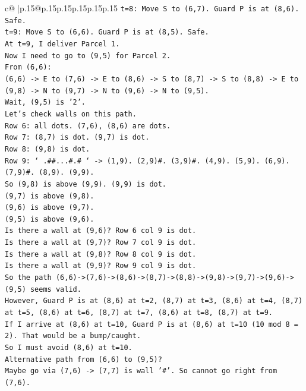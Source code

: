 \documentclass{article}
\begin{document}
{\begin{supertabular}{c@{$\;$}|p{.15\linewidth}@{}p{.15\linewidth}p{.15\linewidth}p{.15\linewidth}p{.15\linewidth}p{.15\linewidth}}
{{{\texttt{t=8: Move S to (6,7). Guard P is at (8,6). Safe.} \\
\texttt{t=9: Move S to (6,6). Guard P is at (8,5). Safe.} \\
\texttt{At t=9, I deliver Parcel 1.} \\
\texttt{Now I need to go to (9,5) for Parcel 2.} \\
\texttt{From (6,6):} \\
\texttt{(6,6) {-}> E to (7,6) {-}> E to (8,6) {-}> S to (8,7) {-}> S to (8,8) {-}> E to (9,8) {-}> N to (9,7) {-}> N to (9,6) {-}> N to (9,5).} \\
\texttt{Wait, (9,5) is '2'.} \\
\texttt{Let's check walls on this path.} \\
\texttt{Row 6: all dots. (7,6), (8,6) are dots.} \\
\texttt{Row 7: (8,7) is dot. (9,7) is dot.} \\
\texttt{Row 8: (9,8) is dot.} \\
\texttt{Row 9: ` .\#\#...\#.\# ` {-}> (1,9). (2,9)\#. (3,9)\#. (4,9). (5,9). (6,9). (7,9)\#. (8,9). (9,9).} \\
\texttt{So (9,8) is above (9,9). (9,9) is dot.} \\
\texttt{(9,7) is above (9,8).} \\
\texttt{(9,6) is above (9,7).} \\
\texttt{(9,5) is above (9,6).} \\
\texttt{Is there a wall at (9,6)? Row 6 col 9 is dot.} \\
\texttt{Is there a wall at (9,7)? Row 7 col 9 is dot.} \\
\texttt{Is there a wall at (9,8)? Row 8 col 9 is dot.} \\
\texttt{Is there a wall at (9,9)? Row 9 col 9 is dot.} \\
\texttt{So the path (6,6){-}>(7,6){-}>(8,6){-}>(8,7){-}>(8,8){-}>(9,8){-}>(9,7){-}>(9,6){-}>(9,5) seems valid.} \\
\texttt{However, Guard P is at (8,6) at t=2, (8,7) at t=3, (8,6) at t=4, (8,7) at t=5, (8,6) at t=6, (8,7) at t=7, (8,6) at t=8, (8,7) at t=9.} \\
\texttt{If I arrive at (8,6) at t=10, Guard P is at (8,6) at t=10 (10 mod 8 = 2). That would be a bump/caught.} \\
\texttt{So I must avoid (8,6) at t=10.} \\
\texttt{Alternative path from (6,6) to (9,5)?} \\
\texttt{Maybe go via (7,6) {-}> (7,7) is wall '\#'. So cannot go right from (7,6).} \\
}}}
\end{supertabular}}
\end{document}
